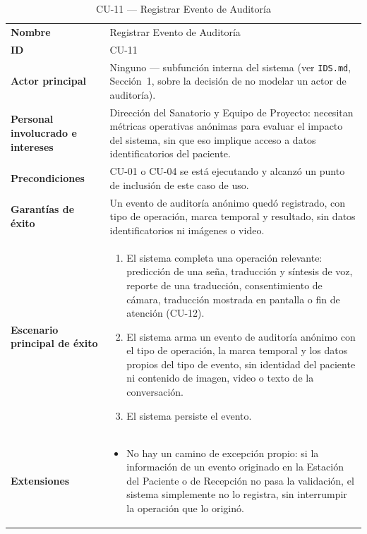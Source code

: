 \begin{longtable}{@{}>{\raggedright\arraybackslash}p{4.1cm} >{\raggedright\arraybackslash}p{\dimexpr\textwidth-4.1cm-2\tabcolsep\relax}@{}}
\caption{CU-11 --- Registrar Evento de Auditoría}\\
\toprule
\textbf{Nombre} & Registrar Evento de Auditoría \\
\textbf{ID} & CU-11 \\
\textbf{Actor principal} & Ninguno --- subfunción interna del sistema (ver \texttt{IDS.md}, Sección~1, sobre la decisión de no modelar un actor de auditoría). \\
\textbf{Personal involucrado e intereses} &
Dirección del Sanatorio y Equipo de Proyecto: necesitan métricas
operativas anónimas para evaluar el impacto del sistema, sin que eso
implique acceso a datos identificatorios del paciente. \\
\textbf{Precondiciones} &
CU-01 o CU-04 se está ejecutando y alcanzó un punto de inclusión de este
caso de uso. \\
\textbf{Garantías de éxito} &
Un evento de auditoría anónimo quedó registrado, con tipo de operación,
marca temporal y resultado, sin datos identificatorios ni imágenes o
video. \\
\textbf{Escenario principal de éxito} &
\begin{enumerate}[leftmargin=*, itemsep=2pt]
    \item El sistema completa una operación relevante: predicción de una
    seña, traducción y síntesis de voz, reporte de una traducción,
    consentimiento de cámara, traducción mostrada en pantalla o fin de
    atención (CU-12).
    \item El sistema arma un evento de auditoría anónimo con el tipo de
    operación, la marca temporal y los datos propios del tipo de evento,
    sin identidad del paciente ni contenido de imagen, video o texto de
    la conversación.
    \item El sistema persiste el evento.
\end{enumerate} \\
\textbf{Extensiones} &
\begin{itemize}[leftmargin=*, itemsep=2pt]
    \item[--] No hay un camino de excepción propio: si la información de
    un evento originado en la Estación del Paciente o de Recepción no
    pasa la validación, el sistema simplemente no lo registra, sin
    interrumpir la operación que lo originó.
\end{itemize} \\

\end{longtable}
